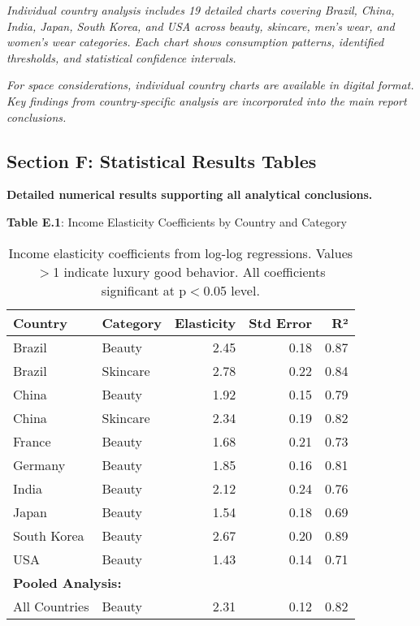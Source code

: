 \documentclass[11pt]{article}
\begin{document}
\textit{Individual country analysis includes 19 detailed charts covering Brazil, China, India, Japan, South Korea, and USA across beauty, skincare, men's wear, and women's wear categories. Each chart shows consumption patterns, identified thresholds, and statistical confidence intervals.}

\textit{For space considerations, individual country charts are available in digital format. Key findings from country-specific analysis are incorporated into the main report conclusions.}

\subsection*{Section F: Statistical Results Tables}

\textbf{Detailed numerical results supporting all analytical conclusions.}

\textbf{Table E.1}: Income Elasticity Coefficients by Country and Category

\begin{table}[H]
\centering
\small
\begin{tabular}{llrrr}
\toprule
Country & Category & Elasticity & Std Error & R² \\
\midrule
Brazil & Beauty & 2.45 & 0.18 & 0.87 \\
Brazil & Skincare & 2.78 & 0.22 & 0.84 \\
China & Beauty & 1.92 & 0.15 & 0.79 \\
China & Skincare & 2.34 & 0.19 & 0.82 \\
France & Beauty & 1.68 & 0.21 & 0.73 \\
Germany & Beauty & 1.85 & 0.16 & 0.81 \\
India & Beauty & 2.12 & 0.24 & 0.76 \\
Japan & Beauty & 1.54 & 0.18 & 0.69 \\
South Korea & Beauty & 2.67 & 0.20 & 0.89 \\
USA & Beauty & 1.43 & 0.14 & 0.71 \\
\midrule
\multicolumn{3}{l}{\textbf{Pooled Analysis:}} & & \\
All Countries & Beauty & 2.31 & 0.12 & 0.82 \\
\bottomrule
\end{tabular}
\caption{Income elasticity coefficients from log-log regressions. Values $>$1 indicate luxury good behavior. All coefficients significant at p$<$0.05 level.}
\end{table}
\end{document}
